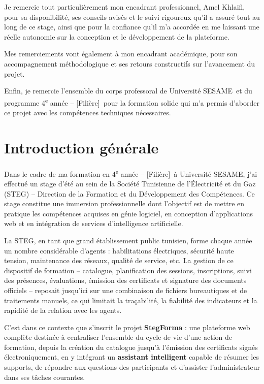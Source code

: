 \documentclass[12pt,a4paper]{report}
\newcommand{\ecole}{Université SESAME}
\newcommand{\filiere}{4\textsuperscript{e} année -- [Filière]}
\newcommand{\organisme}{Société Tunisienne de l'Électricité et du Gaz (STEG) -- Direction de la Formation et du Développement des Compétences}
\newcommand{\encadrantPro}{Amel Khlaifi}
\begin{document}
Je remercie tout particulièrement mon encadrant professionnel, \encadrantPro, pour sa disponibilité, ses conseils avisés et le suivi rigoureux qu'il a assuré tout au long de ce stage, ainsi que pour la confiance qu'il m'a accordée en me laissant une réelle autonomie sur la conception et le développement de la plateforme.

Mes remerciements vont également à mon encadrant académique, pour son accompagnement méthodologique et ses retours constructifs sur l'avancement du projet.

Enfin, je remercie l'ensemble du corps professoral de \ecole\ et du programme \filiere\ pour la formation solide qui m'a permis d'aborder ce projet avec les compétences techniques nécessaires.

\tableofcontents
\listoffigures
\listoftables

\chapter*{Introduction générale}

Dans le cadre de ma formation en \filiere\ à \ecole, j'ai effectué un stage d'été au sein de la \organisme. Ce stage constitue une immersion professionnelle dont l'objectif est de mettre en pratique les compétences acquises en génie logiciel, en conception d'applications web et en intégration de services d'intelligence artificielle.

La STEG, en tant que grand établissement public tunisien, forme chaque année un nombre considérable d'agents : habilitations électriques, sécurité haute tension, maintenance des réseaux, qualité de service, etc. La gestion de ce dispositif de formation -- catalogue, planification des sessions, inscriptions, suivi des présences, évaluations, émission des certificats et signature des documents officiels -- reposait jusqu'ici sur une combinaison de fichiers bureautiques et de traitements manuels, ce qui limitait la traçabilité, la fiabilité des indicateurs et la rapidité de la relation avec les agents.

C'est dans ce contexte que s'inscrit le projet \textbf{StegForma} : une plateforme web complète destinée à centraliser l'ensemble du cycle de vie d'une action de formation, depuis la création du catalogue jusqu'à l'émission des certificats signés électroniquement, en y intégrant un \textbf{assistant intelligent} capable de résumer les supports, de répondre aux questions des participants et d'assister l'administrateur dans ses tâches courantes.
\end{document}
